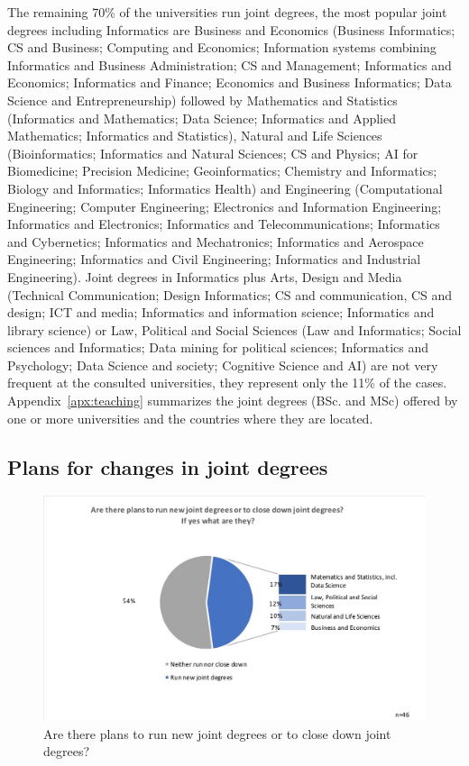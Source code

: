 The remaining 70\% of the universities run joint degrees, the most popular joint degrees including Informatics are  Business and Economics (Business Informatics; CS and Business; Computing and Economics; Information systems combining Informatics and Business Administration; CS and Management; Informatics and Economics; Informatics and Finance; Economics and Business Informatics; Data Science and Entrepreneurship) followed by Mathematics and Statistics (Informatics and Mathematics; Data Science; Informatics and Applied Mathematics; Informatics and Statistics), Natural and Life Sciences (Bioinformatics; Informatics and Natural Sciences; CS and Physics; AI for Biomedicine; Precision Medicine; Geoinformatics; Chemistry and Informatics; Biology and Informatics; Informatics Health) and Engineering (Computational Engineering; Computer Engineering; Electronics and Information Engineering; Informatics and Electronics; Informatics and Telecommunications; Informatics and Cybernetics; Informatics and Mechatronics; Informatics and Aerospace Engineering; Informatics and Civil Engineering; Informatics and Industrial Engineering). Joint degrees in Informatics plus Arts, Design and Media (Technical Communication; Design Informatics; CS and communication, CS and design; ICT and media; Informatics and information science; Informatics and library science) or Law, Political and Social Sciences (Law and Informatics; Social sciences and Informatics; Data mining for political sciences; Informatics and Psychology; Data Science and society; Cognitive Science and AI) are not very frequent at the consulted universities, they represent only the 11\% of the cases. Appendix~\ref{apx:teaching} summarizes  the joint degrees (BSc. and MSc) offered by one or more universities and the countries where they are located.

\subsection{Plans for changes in joint degrees} 

\begin{figure}[h]
\includegraphics[width = \linewidth]{charts/2b.jpg}
\caption{Are there plans to run new joint degrees or to close down joint degrees?}
\label{sect3:change}
\end{figure}

